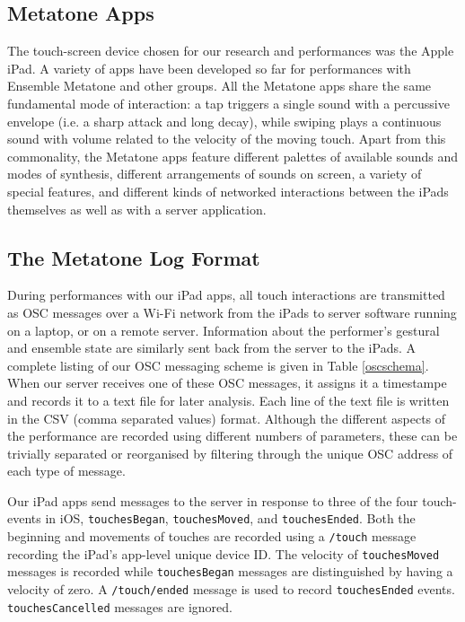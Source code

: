 \documentclass[graybox]{svmult}
\begin{document}
\subsection{Metatone Apps}
\label{subsec:metatone-apps}

The touch-screen device chosen for our research and performances was
the Apple iPad. A variety of apps have been developed so far for
performances with Ensemble Metatone and other groups. All the Metatone
apps share the same fundamental mode of interaction: a tap triggers a
single sound with a percussive envelope (i.e. a sharp attack and long
decay), while swiping plays a continuous sound with volume related to
the velocity of the moving touch. Apart from this commonality, the
Metatone apps feature different palettes of available sounds and modes
of synthesis, different arrangements of sounds on screen, a variety of
special features, and different kinds of networked interactions between
the iPads themselves as well as with a server application.

\subsection{The Metatone Log Format}
\label{subsec:metatone-log}

During performances with our iPad apps, all touch interactions are
transmitted as OSC messages over a Wi-Fi network from the iPads to
server software running on a laptop, or on a remote server.
Information about the performer's gestural and ensemble state are
similarly sent back from the server to the iPads. A complete listing
of our OSC messaging scheme is given in Table \ref{oscschema}. When our
server receives one of these OSC messages, it assigns it a timestampe
and records it to a text file for later analysis. Each line of the
text file is written in the CSV (comma separated values) format.
Although the different aspects of the performance are recorded using
different numbers of parameters, these can be trivially separated or
reorganised by filtering through the unique OSC address of each type
of message. 

Our iPad apps send messages to the server in response to three of the
four touch-events in iOS, \texttt{touchesBegan},
\texttt{touchesMoved}, and \texttt{touchesEnded}. Both the beginning
and movements of touches are recorded using a \texttt{/touch} message
recording the iPad's app-level unique device ID. The velocity of
\texttt{touchesMoved} messages is recorded while \texttt{touchesBegan}
messages are distinguished by having a velocity of zero. A
\texttt{/touch/ended} message is used to record \texttt{touchesEnded}
events. \texttt{touchesCancelled} messages are ignored.
 
\end{document}
